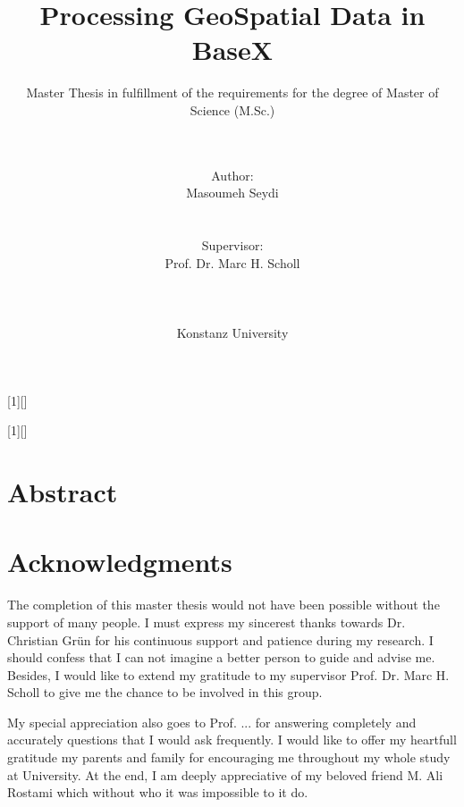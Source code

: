 \documentclass[a4paper,12pt]{article}
\title{Processing GeoSpatial Data in BaseX}
\subtitle{Master Thesis in fulfillment of the requirements for the degree of
Master of Science (M.Sc.)}
\author{\\\\Author: \\
	Masoumeh Seydi
	\\\\\\Supervisor: \\
	Prof. Dr. Marc H. Scholl \\ 
	\\\\\\
	Konstanz University}
\begin{document}
[1][]{
\lstset{#1}}{}

[1][]{
\lstset{#1}}{}


\renewcommand{\lstlistingname}{Code}


\maketitle
\thispagestyle{empty}

\newpage
\section*{Abstract}

\thispagestyle{empty}

\newpage
\section*{Acknowledgments}
\thispagestyle{empty}

The completion of this master thesis would not have been possible 
without the support of many people. 
I must express my sincerest thanks towards 
Dr. Christian Gr{\"u}n for his continuous support and patience during my research.
I should confess that I can not imagine a better person to guide and advise me. Besides, I would like to extend my gratitude to my supervisor Prof. Dr. Marc H. Scholl to give me the chance to be involved in this group.

My special appreciation also goes to Prof. ...  for
answering completely and accurately questions that I would ask
frequently. I would like to offer my heartfull gratitude my parents and family for encouraging me 
throughout my whole study at University. At the end, I am deeply appreciative of my beloved friend M. Ali Rostami which without who it was impossible to it do.
\end{document}
